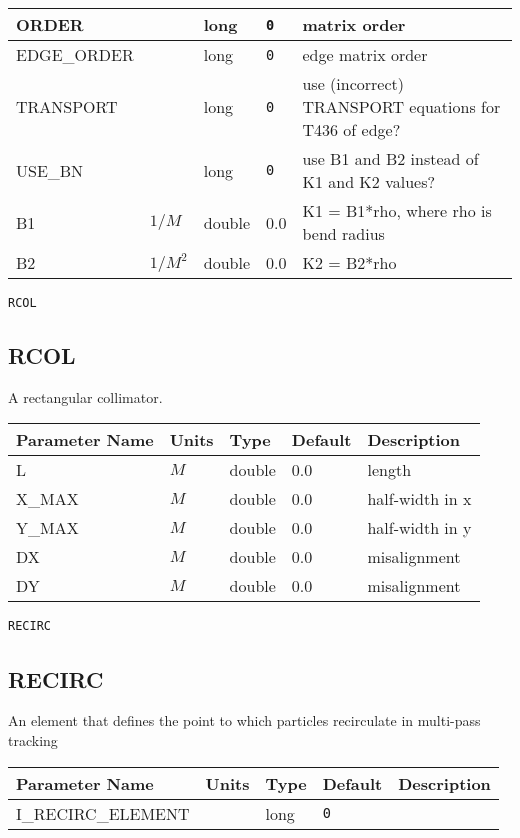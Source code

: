 \begin{tabular}{|l|l|l|l|p{\descwidth}|}
ORDER &  & long &  \verb|0| & matrix order  \\ \hline 
EDGE\_ORDER &  & long &  \verb|0| & edge matrix order  \\ \hline 
TRANSPORT &  & long &  \verb|0| & use (incorrect) TRANSPORT equations for T436 of edge?  \\ \hline 
USE\_BN &  & long &  \verb|0| & use B1 and B2 instead of K1 and K2 values?  \\ \hline 
B1 & $1/M$ & double &  0.0 & K1 = B1*rho, where rho is bend radius  \\ \hline 
B2 & $1/M^{2}$ & double &  0.0 & K2 = B2*rho  \\ \hline 
\end{tabular}

\begin{latexonly}
\newpage
\begin{center}{\Large\verb|RCOL|}\end{center}
\end{latexonly}\subsection{RCOL}
A rectangular collimator.
\\
\begin{tabular}{|l|l|l|l|p{\descwidth}|} \hline
Parameter Name & Units & Type & Default & Description \\ \hline 
L & $M$ & double &  0.0 & length  \\ \hline 
X\_MAX & $M$ & double &  0.0 & half-width in x  \\ \hline 
Y\_MAX & $M$ & double &  0.0 & half-width in y  \\ \hline 
DX & $M$ & double &  0.0 & misalignment  \\ \hline 
DY & $M$ & double &  0.0 & misalignment  \\ \hline 
\end{tabular}

\begin{latexonly}
\newpage
\begin{center}{\Large\verb|RECIRC|}\end{center}
\end{latexonly}\subsection{RECIRC}
An element that defines the point to which particles recirculate in multi-pass
tracking
\\
\begin{tabular}{|l|l|l|l|p{\descwidth}|} \hline
Parameter Name & Units & Type & Default & Description \\ \hline 
I\_RECIRC\_ELEMENT &  & long &  \verb|0| & \\ \hline 
\end{tabular}

